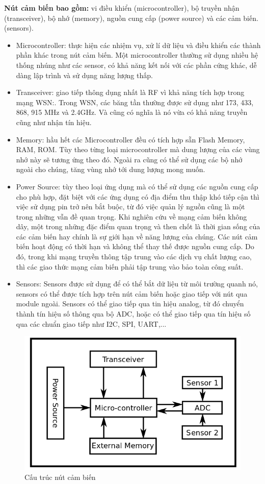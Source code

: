 \documentclass{report}
\begin{document}
\noindent
\textbf{Nút cảm biến bao gồm:} vi điều khiển (microcontroller), bộ truyền nhận (transceiver), bộ nhớ (memory), nguồn cung cấp (power source) và các cảm biến.
(sensors).
\begin{itemize}
\item Microcontroller: thực hiện các nhiệm vụ, xử lí dữ liệu và điều khiển các thành phần khác
trong nút cảm biến. Một microcontroller thường sử dụng nhiều hệ thống nhúng như các sensor,
có khả năng kết nối với các phần cứng khác, dễ dàng lập trình và sử dụng năng lượng thấp.
\item Transceiver: giao tiếp thông dụng nhất là RF vì khả năng tích hợp trong mạng WSN:. Trong
WSN, các băng tần thường được sử dụng như 173, 433, 868, 915 MHz và 2.4GHz. Và cũng có
nghĩa là nó vừa có khả năng truyền cũng như nhận tín hiệu.
\item Memory: hầu hết các Microcontroller đều có tích hợp sẵn Flash Memory, RAM, ROM. Tùy
theo từng loại microcontroller mà dung lượng của các vùng nhớ này sẽ tương ứng theo đó.
Ngoài ra cũng có thể sử dụng các bộ nhớ ngoài cho chúng, tăng vùng nhớ tới dung lượng mong
muốn.
\item Power Source: tùy theo loại ứng dụng mà có thể sử dụng các nguồn cung cấp cho phù hợp,
đặt biệt với các ứng dụng có địa điểm thu thập khó tiếp cận thì việc sử dụng pin trở nên bắt
buộc, từ đó việc quản lý nguồn cũng là một trong những vẫn đề quan trọng. Khi nghiên cứu về mạng cảm biến không dây, một trong những đặc điểm quan trọng và then chốt là thời gian sống của các cảm biến hay chính là sự giới hạn về năng lượng của chúng. Các nút cảm biến hoạt động có thời hạn và không thể thay thế được nguồn cung cấp. Do đó, trong khi mạng truyền thông tập trung vào các dịch vụ chất lượng cao, thì các giao thức mạng cảm biến phải tập trung vào bảo toàn công suất.
\item Sensors: Sensors được sử dụng để có thể bắt dữ liệu từ môi trường quanh nó, sensors có thể
được tích hợp trên nút cảm biến hoặc giao tiếp với nút qua module ngoài. Sensors có thể giao
tiếp qua tin hiệu analog, từ đó chuyển thành tín hiệu số thông qua bộ ADC, hoặc có thể giao
tiếp qua tín hiệu số qua các chuẩn giao tiếp như I2C, SPI, UART,...
\end{itemize}
\begin{figure}[h]
	\centering
	\includegraphics[scale = 0.3]{fig2.png}
	\caption{Cấu trúc nút cảm biến}
	\label{fig:Graph2}
\end{figure}
\end{document}
